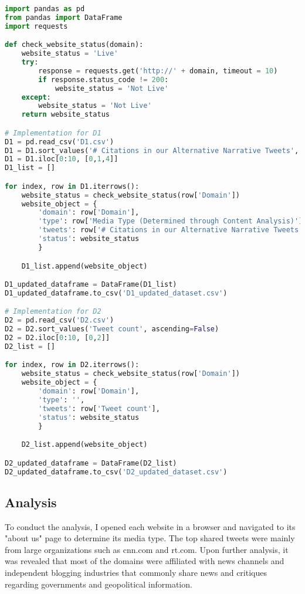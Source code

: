 \documentclass[12pt]{article}
\begin{document}
\begin{lstlisting}[language=Python, caption=Generate a graph for various cluster sizes.] 
import pandas as pd
from pandas import DataFrame
import requests

def check_website_status(domain):
    website_status = 'Live'
    try:
        response = requests.get('http://' + domain, timeout = 10)
        if response.status_code != 200:
            website_status = 'Not Live'
    except:
        website_status = 'Not Live'
    return website_status

# Implementation for D1
D1 = pd.read_csv('D1.csv')
D1 = D1.sort_values('# Citations in our Alternative Narrative Tweets', ascending=False)
D1 = D1.iloc[0:10, [0,1,4]]
D1_list = []

for index, row in D1.iterrows():
    website_status = check_website_status(row['Domain'])
    website_object = { 
        'domain': row['Domain'], 
        'type': row['Media Type (Determined through Content Analysis)'],
        'tweets': row['# Citations in our Alternative Narrative Tweets'],
        'status': website_status
        }

    D1_list.append(website_object)

D1_updated_dataframe = DataFrame(D1_list)
D1_updated_dataframe.to_csv('D1_updated_dataset.csv')

# Implementation for D2
D2 = pd.read_csv('D2.csv')
D2 = D2.sort_values('Tweet count', ascending=False)
D2 = D2.iloc[0:10, [0,2]]
D2_list = []

for index, row in D2.iterrows():
    website_status = check_website_status(row['Domain'])
    website_object = { 
        'domain': row['Domain'], 
        'type': '',
        'tweets': row['Tweet count'],
        'status': website_status
        }

    D2_list.append(website_object)

D2_updated_dataframe = DataFrame(D2_list)
D2_updated_dataframe.to_csv('D2_updated_dataset.csv')


\end{lstlisting}

\subsection*{Analysis}
To conduct the analysis, I opened each website in a browser and navigated to its "about us" page to determine its media type. The top shared tweets were mainly from large organizations such as cnn.com and rt.com. Upon further analysis, it was revealed that most of the domains were affiliated with news channels and independent blogging industries that commonly share news and critiques regarding governments and geopolitical information.
\end{document}
